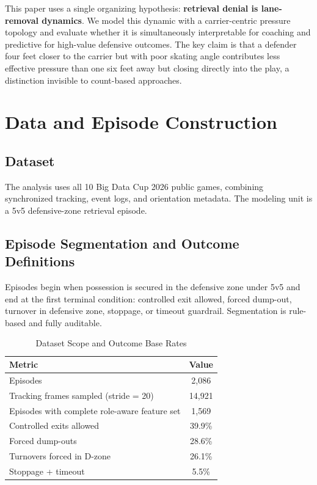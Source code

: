 \documentclass[10pt]{article}
\begin{document}
This paper uses a single organizing hypothesis: \textbf{retrieval denial is lane-removal dynamics}. We model this dynamic with a carrier-centric pressure topology and evaluate whether it is simultaneously interpretable for coaching and predictive for high-value defensive outcomes. The key claim is that a defender four feet closer to the carrier but with poor skating angle contributes less effective pressure than one six feet away but closing directly into the play, a distinction invisible to count-based approaches.

\section{Data and Episode Construction}
\subsection{Dataset}
The analysis uses all 10 Big Data Cup 2026 public games, combining synchronized tracking, event logs, and orientation metadata. The modeling unit is a 5v5 defensive-zone retrieval episode.

\subsection{Episode Segmentation and Outcome Definitions}
Episodes begin when possession is secured in the defensive zone under 5v5 and end at the first terminal condition: controlled exit allowed, forced dump-out, turnover in defensive zone, stoppage, or timeout guardrail. Segmentation is rule-based and fully auditable.

\begin{table}[H]
\centering
\small
\caption{Dataset Scope and Outcome Base Rates}
\begin{tabular}{lc}
\toprule
Metric & Value \\
\midrule
Episodes & 2,086 \\
Tracking frames sampled (stride = 20) & 14,921 \\
Episodes with complete role-aware feature set & 1,569 \\
\midrule
Controlled exits allowed & 39.9\% \\
Forced dump-outs & 28.6\% \\
Turnovers forced in D-zone & 26.1\% \\
Stoppage + timeout & 5.5\% \\
\bottomrule
\end{tabular}
\label{tab:data_scope}
\end{table}
\end{document}
